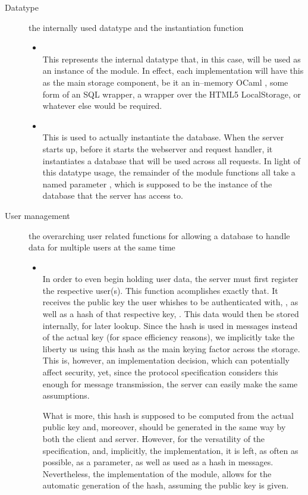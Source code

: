 \begin{description}
  \item[Datatype] the internally used datatype and the instantiation function
  \begin{itemize}
    \item {} \\
    This represents the internal datatype that, in this case, will be used as an instance of the module.
    In effect, each implementation will have this as the main storage component, be it an in--memory OCaml , some form of an SQL wrapper, a wrapper over the HTML5 LocalStorage, or whatever else would be required.
    \item {} \\
    This is used to actually instantiate the database.
    When the server starts up, before it starts the webserver and request handler, it instantiates a database that will be used across all requests.
    In light of this datatype usage, the remainder of the module functions all take a named parameter , which is supposed to be the instance of the database that the server has access to.
  \end{itemize}

  \item[User management] the overarching user related functions for allowing a database to handle data for multiple users at the same time
  \begin{itemize}
  \item {} \\
  In order to even begin holding user data, the server must first register the respective user(s).
  This function acomplishes exactly that.
  It receives the public key the user whishes to be authenticated with, , as well as a hash of that respective key, .
  This data would then be stored internally, for later lookup.
  Since the hash is used in messages instead of the actual key (for space efficiency reasons), we implicitly take the liberty us using this hash as the main keying factor across the storage.
  This is, however, an implementation decision, which can potentially affect security, yet, since the protocol specification considers this enough for message transmission, the server can easily make the same assumptions.

  What is more, this hash is supposed to be computed from the actual public key and, moreover, should be generated in the same way by both the client and server.
  However, for the versatility of the specification, and, implicitly, the implementation, it is left, as often as possible, as a parameter, as well as used as a hash in messages.
  Nevertheless, the implementation of the  module, allows for the automatic generation of the hash, assuming the public key is given.


\end{itemize}
\end{description}

